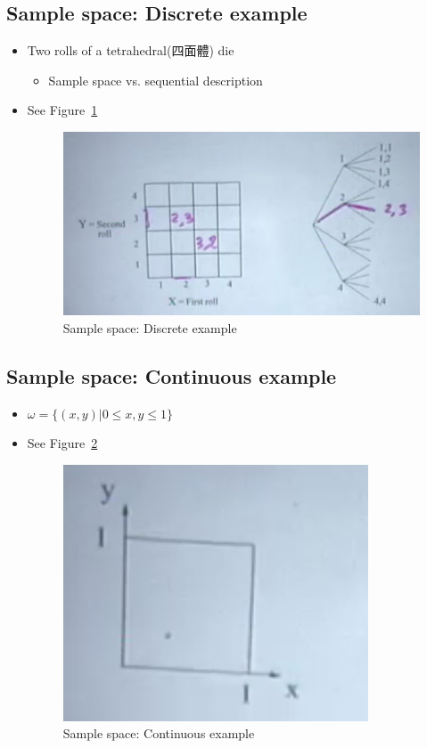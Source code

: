     \subsection{Sample space: Discrete example}
    \begin{itemize}
        \item Two rolls of a tetrahedral(四面體) die
        \begin{itemize}
            \item Sample space vs. sequential description
        \end{itemize}

        \item See Figure~\ref{fig:1-1}
		 
		 \begin{figure}[h!] %
		\centering
		 \includegraphics[scale=0.7]{images/1-1}
		\caption{Sample space: Discrete example}
		 \label{fig:1-1}
		 \end{figure}
    \end{itemize}

    \subsection{Sample space: Continuous example}
    \begin{itemize}
        \item $\omega = \{(x,y) | 0 \le x,y \le 1\}$
        \item See Figure~\ref{fig:1-2}
		 
        \begin{figure}[h!] %
       \centering
        \includegraphics[scale=0.7]{images/1-2}
       \caption{Sample space: Continuous example}
        \label{fig:1-2}
        \end{figure}
    \end{itemize}

